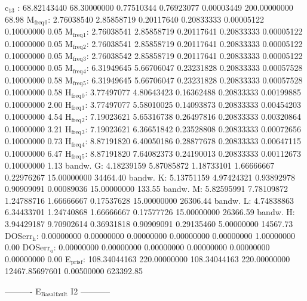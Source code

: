 \documentclass[11pt]{article}
\begin{document}
c\(_{\text{13}}\)    :  68.82143440  68.30000000   0.77510344   0.76923077   0.00003449 200.00000000        68.98
M\(_{\text{freq}}\)\(_{\text{0}}\):   2.76038540   2.85858719   0.20117640   0.20833333   0.00005122   0.10000000         0.05
M\(_{\text{freq}}\)\(_{\text{1}}\):   2.76038541   2.85858719   0.20117641   0.20833333   0.00005122   0.10000000         0.05
M\(_{\text{freq}}\)\(_{\text{2}}\):   2.76038541   2.85858719   0.20117641   0.20833333   0.00005122   0.10000000         0.05
M\(_{\text{freq}}\)\(_{\text{3}}\):   2.76038542   2.85858719   0.20117641   0.20833333   0.00005122   0.10000000         0.05
M\(_{\text{freq}}\)\(_{\text{4}}\):   6.31949645   5.66706047   0.23231828   0.20833333   0.00057528   0.10000000         0.58
M\(_{\text{freq}}\)\(_{\text{5}}\):   6.31949645   5.66706047   0.23231828   0.20833333   0.00057528   0.10000000         0.58
H\(_{\text{freq}}\)\(_{\text{0}}\):   3.77497077   4.80643423   0.16362488   0.20833333   0.00199885   0.10000000         2.00
H\(_{\text{freq}}\)\(_{\text{1}}\):   3.77497077   5.58010025   0.14093873   0.20833333   0.00454203   0.10000000         4.54
H\(_{\text{freq}}\)\(_{\text{2}}\):   7.19023621   5.65316738   0.26497816   0.20833333   0.00320864   0.10000000         3.21
H\(_{\text{freq}}\)\(_{\text{3}}\):   7.19023621   6.36651842   0.23528808   0.20833333   0.00072656   0.10000000         0.73
H\(_{\text{freq}}\)\(_{\text{4}}\):   8.87191820   6.40050186   0.28877678   0.20833333   0.00647115   0.10000000         6.47
H\(_{\text{freq}}\)\(_{\text{5}}\):   8.87191820   7.64082373   0.24190013   0.20833333   0.00112673   0.10000000         1.13
bandw. G:   4.18239159   5.87085872   1.18733101   1.66666667   0.22976267  15.00000000     34464.40
bandw. K:   5.13751159   4.97424321   0.93892978   0.90909091   0.00089036  15.00000000       133.55
bandw. M:   5.82595991   7.78109872   1.24788716   1.66666667   0.17537628  15.00000000     26306.44
bandw. L:   4.74838863   6.34433701   1.24740868   1.66666667   0.17577726  15.00000000     26366.59
bandw. H:   3.94429187   9.70902614   0.36931818   0.90909091   0.29135460   5.00000000     14567.73
DOSerr\(_{\text{h}}\):   0.00000000   0.00000000   0.00000000   0.00000000   0.00000000   1.00000000         0.00
DOSerr\(_{\text{o}}\):   0.00000000   0.00000000   0.00000000   0.00000000   0.00000000   0.00000000         0.00
E\(_{\text{pris}}\)\(_{\text{f}}\): 108.34044163 220.00000000 108.34044163 220.00000000 12467.85697601   0.00500000    623392.85

----------     E\(_{\text{Basal}}\)\(_{\text{fault}}\) I2     -----------
\end{document}
